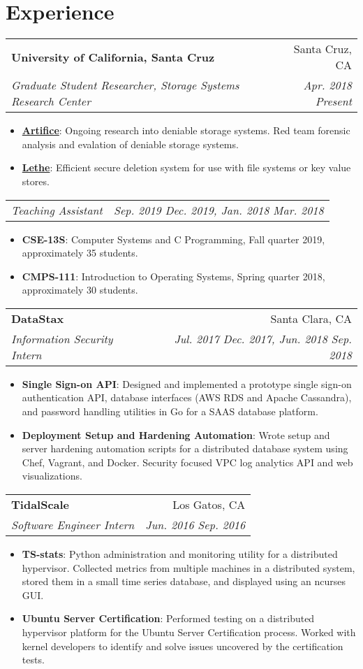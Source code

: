 \documentclass[letterpaper,10pt,oneside]{memoir}
\makeatletter
\newcommand{\resumeItem}[2]{
  \item\small{
    \textbf{#1}{: #2}
  }
}
\newcommand{\resumeSubheading}[4]{
  \vspace{1pt}%
    \begin{tabular*}{0.99\textwidth}[t]{l@{\extracolsep{\fill}}r}
      \textbf{#1} & #2 \\
      \textit{\small #3} & \textit{\small #4} \\
    \end{tabular*}
}
\newcommand{\resumeSubheadingContinue}[2]{
  \vspace{-1pt}
    \begin{tabular*}{0.99\textwidth}[t]{l@{\extracolsep{\fill}}r}
      \textit{\small #1} & \textit{\small #2} \\
    \end{tabular*}
}
\newcommand{\resumeSubHeadingListStart}{\vspace{1pt}\begin{itemize}[noitemsep,nolistsep,leftmargin=*,label={}]}
\newcommand{\resumeItemListStart}{\begin{itemize}[noitemsep,nolistsep]}
\newcommand{\resumeItemListEnd}{\end{itemize}}
\makeatother
\begin{document}
\section{Experience}
    \resumeSubheading
      {University of California, Santa Cruz}{Santa Cruz, CA}
      {Graduate Student Researcher, Storage Systems Research Center}{Apr. 2018 \textemdash{} Present}
      \resumeItemListStart
        \resumeItem{\href{https://www.ssrc.ucsc.edu/proj/Artifice.html}{Artifice}}
    	  {Ongoing research into deniable storage systems. Red team forensic analysis and evalation of deniable storage systems.} 
    	\resumeItem{\href{https://www.ssrc.ucsc.edu/proj/securefs.html}{Lethe}}
    	  {Efficient secure deletion system for use with file systems or key value stores.}
      \resumeItemListEnd

    \resumeSubheadingContinue
      {Teaching Assistant}{Sep. 2019 \textemdash{} Dec. 2019, Jan. 2018 \textemdash{} Mar. 2018}
      \resumeItemListStart
        \resumeItem{CSE-13S}
          {Computer Systems and C Programming, Fall quarter 2019, approximately 35 students.}
        \resumeItem{CMPS-111}
          {Introduction to Operating Systems, Spring quarter 2018, approximately 30 students.}
      \resumeItemListEnd

    \resumeSubheading
      {DataStax}{Santa Clara, CA}
      {Information Security Intern }{ Jul. 2017 \textemdash{} Dec. 2017, Jun. 2018 \textemdash{} Sep. 2018}
      \resumeItemListStart
        \resumeItem{Single Sign-on API}
	  {Designed and implemented a prototype single sign-on authentication API, database interfaces (AWS RDS and Apache Cassandra), and password handling utilities in Go for a SAAS database platform.}
        \resumeItem{Deployment Setup and Hardening Automation}
          {Wrote setup and server hardening automation scripts for a distributed database system using Chef, Vagrant, and Docker. Security focused VPC log analytics API and web visualizations.}
      \resumeItemListEnd

    \resumeSubheading
      {TidalScale}{Los Gatos, CA}
      {Software Engineer Intern}{Jun. 2016 \textemdash{} Sep. 2016}
      \resumeItemListStart
        \resumeItem{TS-stats}
          {Python administration and monitoring utility for a distributed hypervisor. Collected metrics from multiple machines in a distributed system, stored them in a small time series database, and displayed using an ncurses GUI.}
        \resumeItem{Ubuntu Server Certification}
	  {Performed testing on a distributed hypervisor platform for the Ubuntu Server Certification process. Worked with kernel developers to identify and solve issues uncovered by the certification tests.}
      \resumeItemListEnd
\end{document}
